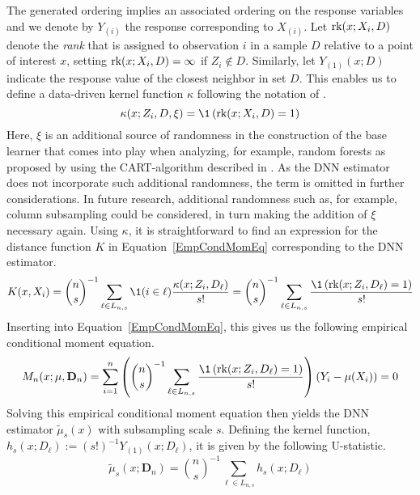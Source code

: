 The generated ordering implies an associated ordering on the response variables and we denote by $Y_{(i)}$ the response corresponding to $X_{(i)}$.
Let $\text{rk}(x; X_{i}, D)$ denote the \textit{rank} that is assigned to observation $i$ in a sample $D$ relative to a point of interest $x$, setting $\text{rk}(x; X_{i}, D) = \infty$ if $Z_{i} \not\in D$.
Similarly, let $Y_{(1)}(x; D)$ indicate the response value of the closest neighbor in set $D$.
This enables us to define a data-driven kernel function $\kappa$ following the notation of \citet{ritzwoller_simultaneous_2024}.
\begin{equation}
	\kappa(x; Z_{i}, D, \xi)
	= \1\left(\rk(x; X_{i}, D) = 1\right)
\end{equation}
Here, $\xi$ is an additional source of randomness in the construction of the base learner that comes into play when analyzing, for example, random forests as proposed by \citet{breiman_random_2001} using the CART-algorithm described in \citet{breiman_classification_2017}.
As the DNN estimator does not incorporate such additional randomness, the term is omitted in further considerations.
In future research, additional randomness such as, for example, column subsampling could be considered, in turn making the addition of $\xi$ necessary again.
Using $\kappa$, it is straightforward to find an expression for the distance function $K$ in Equation~\ref{EmpCondMomEq} corresponding to the DNN estimator.
\begin{equation}\label{eq:data_distance}
	K(x, X_{i})
	= \binom{n}{s}^{-1} \sum_{\ell \in L_{n,s}} \1(i \in \ell)\frac{\kappa(x; Z_{i}, D_{\ell})}{s!}
	= \binom{n}{s}^{-1} \sum_{\ell \in L_{n,s}} \frac{\1\left(\rk(x; Z_{i}, D_{\ell}) = 1\right)}{s!}
\end{equation}
Inserting into Equation~\ref{EmpCondMomEq}, this gives us the following empirical conditional moment equation.
\begin{equation}
	\begin{aligned}
		M_n(x; \mu, \mathbf{D}_n)
		= \sum_{i = 1}^{n}\left(\binom{n}{s}^{-1} \sum_{\ell \in L_{n,s}} \frac{\1\left(\rk(x; Z_{i}, D_{\ell}) = 1\right)}{s!}\right)\left(Y_{i} - \mu(X_{i})\right)
		= 0
	\end{aligned}
\end{equation}
Solving this empirical conditional moment equation then yields the DNN estimator $\tilde{\mu}_{s}(x)$ with subsampling scale $s$.
Defining the kernel function, $h_{s}(x; D_{\ell}) := (s!)^{-1} Y_{(1)}(x; D_{\ell})$, it is given by the following U-statistic.
\begin{equation}\label{eq:U_stat}
	\tilde{\mu}_{s}(x; \mathbf{D}_n)
	= \binom{n}{s}^{-1} \sum_{\ell \in L_{n,s}} h_{s}(x; D_{\ell})
\end{equation}
